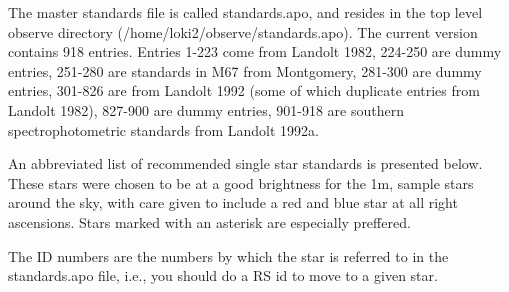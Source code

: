 \documentclass[10pt]{report}
\renewcommand{\[}{\begin{eqnarray}}
\renewcommand{\]}{\end{eqnarray}}
\begin{document}
The master standards file is called standards.apo, and resides in the top
level observe directory (/home/loki2/observe/standards.apo). The current
version contains 918 entries. Entries 1-223 come from Landolt 1982,
224-250 are dummy entries, 251-280 are standards in M67 from Montgomery,
281-300 are dummy entries, 301-826 are from Landolt 1992 (some of which
duplicate entries from Landolt 1982), 827-900 are
dummy entries, 901-918 are southern spectrophotometric standards
from Landolt 1992a.

An abbreviated list of recommended single star standards is presented below.
These stars were chosen to be at a good brightness for the 1m, sample
stars around the sky, with care given to include a red and blue star at
all right ascensions. Stars marked with an asterisk are especially preffered.

The ID numbers are the numbers by which the star is referred to in the
standards.apo file, i.e., you should do a RS id to move to a given
star.
\end{document}
